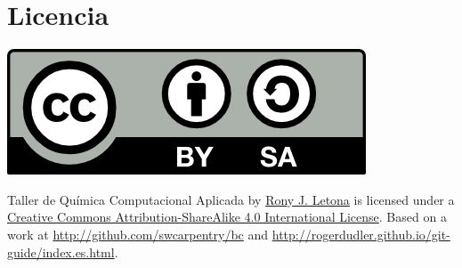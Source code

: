 \documentclass[10pt,letterpaper]{article}
\begin{document}
\section*{Licencia}

\noindent \includegraphics{img/cc_big.png}

\noindent Taller de Qu\'imica Computacional Aplicada by \href{http://github.com/zronyj/TC3Q}{Rony J. Letona} is licensed under a \href{http://creativecommons.org/licenses/by-sa/4.0/}{Creative Commons Attribution-ShareAlike 4.0 International License}.
Based on a work at \url{http://github.com/swcarpentry/bc} and \url{http://rogerdudler.github.io/git-guide/index.es.html}.
\end{document}
